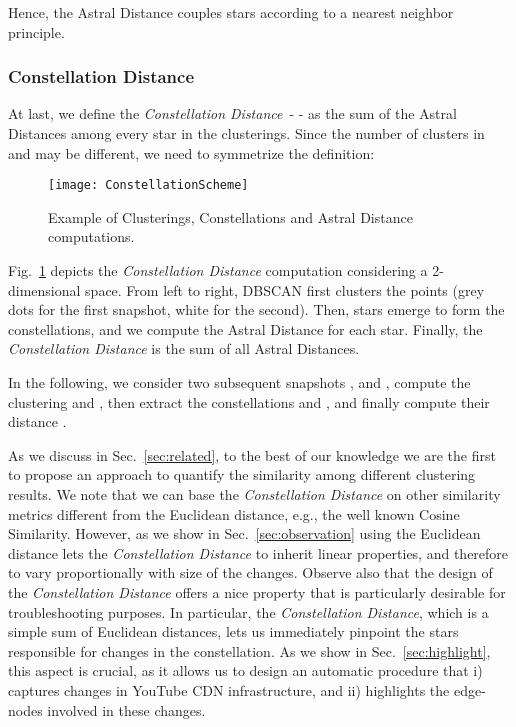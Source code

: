 \documentclass{acm_proc_article-sp}
\newcommand{\distance}{\textit{Constellation Distance}\xspace}
\newcommand{\nodes}{{edge-nodes}\xspace}
\begin{document}
Hence, the Astral Distance couples stars according to a nearest neighbor principle. 

\subsubsection{Constellation Distance} At last, we define the \distance\ -  - as the sum of the Astral Distances among every star in the clusterings. Since the number of clusters in  and  may be different, we need to symmetrize the definition:


\begin{figure}[t!]
\centering
    \texttt{[image: ConstellationScheme]}
    \caption{Example of Clusterings, Constellations and Astral Distance computations.}
    \label{fig:distance}
\end{figure}

Fig.~\ref{fig:distance} depicts the \distance computation considering a 2-dimensional space. From left to right, DBSCAN first clusters the points (grey dots for the first snapshot, white for the second). Then, stars emerge to form the constellations, and we compute the Astral Distance for each star. Finally, the \distance is the sum of all Astral Distances.

In the following, we consider two subsequent snapshots , and , compute the clustering  and , then extract the constellations   and , and finally compute their distance .

As we discuss in Sec.~\ref{sec:related}, to the best of our knowledge we are the first to propose an approach to quantify the similarity among different clustering results. We note that we can base the \distance on other similarity metrics different from the Euclidean distance, e.g., the well known Cosine Similarity. 
However, as we show in Sec.~\ref{sec:observation} using the Euclidean distance lets the \distance to inherit linear properties, and therefore to vary proportionally with size of the changes. Observe also that the design of the \distance offers a nice property that is particularly desirable for troubleshooting purposes. In particular, the \distance, which is a simple sum of Euclidean distances, lets us immediately pinpoint the stars responsible for changes in the constellation. As we show in Sec.~\ref{sec:highlight}, this aspect is crucial, as it allows us to design an automatic procedure that i) captures changes in YouTube CDN infrastructure, and ii) highlights the \nodes involved in these changes.
\end{document}
